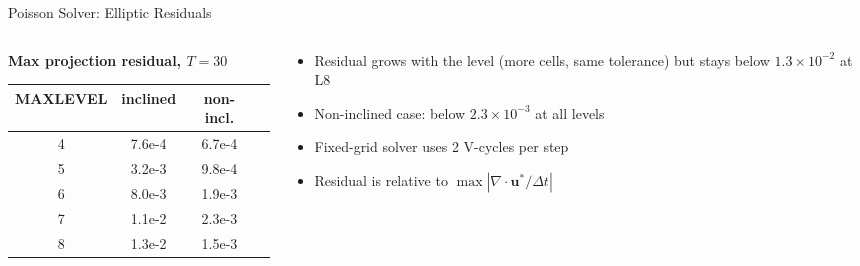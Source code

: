\documentclass[10pt,aspectratio=43]{beamer}
\begin{document}
\begin{frame}{Poisson Solver: Elliptic Residuals}
  \begin{columns}[T]
    \begin{column}{0.52\textwidth}
      \centering\small
      \textbf{Max projection residual, $T=30$}\\[0.05cm]
      \begin{tabular}{@{}ccc r@{}}
        \toprule
        MAXLEVEL & inclined & non-incl. \\
        \midrule
        4 & 7.6e-4 & 6.7e-4 \\
        5 & 3.2e-3 & 9.8e-4 \\
        6 & 8.0e-3 & 1.9e-3 \\
        7 & 1.1e-2 & 2.3e-3 \\
        8 & 1.3e-2 & 1.5e-3 \\
        \bottomrule
      \end{tabular}
    \end{column}
    \begin{column}{0.45\textwidth}
      \begin{itemize}\small
        \item Residual grows with the level (more cells, same tolerance) but stays below $1.3\times10^{-2}$ at L8
        \item Non-inclined case: below $2.3\times10^{-3}$ at all levels
        \item Fixed-grid solver uses 2 V-cycles per step
        \item Residual is relative to $\max|\nabla\cdot\mathbf{u}^{*}/\Delta t|$
      \end{itemize}
    \end{column}
  \end{columns}
\end{frame}
\end{document}
